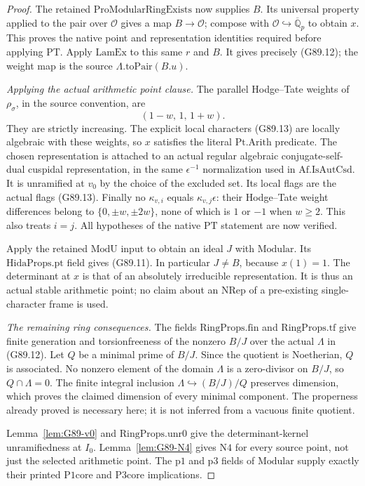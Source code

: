 \begin{proof}
The retained \(\mathrm{ProModularRingExists}\) now supplies
\(B\).  Its universal property applied to the pair over
\(\mathcal O\) gives a map \(B\to\mathcal O\);
compose with \(\mathcal O\hookrightarrow\overline{\mathbb Q}_p\)
to obtain \(x\).
This proves the native point and representation identities
required before applying \(\mathrm{PT}\).
Apply \(\mathrm{LamEx}\) to this same \(r\) and \(B\).
It gives precisely (G89.12); the weight map is the source
\(\Lambda.\mathrm{toPair}(B.u)\).

\emph{Applying the actual arithmetic point clause.}
The parallel Hodge--Tate weights of \(\rho_\sigma\), in the
source convention, are
\[
                         (1-w,\,1,\,1+w).         \tag{G89.14}
\]
They are strictly increasing.
The explicit local characters (G89.13) are locally algebraic
with these weights, so \(x\) satisfies the literal
\(\mathrm{Pt.Arith}\) predicate.
The chosen representation is attached to an actual regular
algebraic conjugate-self-dual cuspidal representation, in the
same \(\epsilon^{-1}\) normalization used in
\(\mathrm{Af.IsAutCsd}\).
It is unramified at \(v_0\) by the choice of the excluded set.
Its local flags are the actual flags (G89.13).
Finally no \(\kappa_{v,i}\) equals
\(\kappa_{v,j}\epsilon\): their Hodge--Tate weight differences
belong to \(\{0,\pm w,\pm2w\}\), none of which is \(1\) or
\(-1\) when \(w\ge2\).
This also treats \(i=j\).
All hypotheses of the native \(\mathrm{PT}\) statement
are now verified.

Apply the retained \(\mathrm{ModU}\) input to obtain
an ideal \(J\) with \(\mathrm{Modular}\).
Its \(\mathrm{HidaProps.pt}\) field gives (G89.11).
In particular \(J\ne B\), because \(x(1)=1\).
The determinant at \(x\) is that of an absolutely irreducible
representation.  It is thus an actual stable arithmetic point;
no claim about an \(\mathrm{NRep}\) of a pre-existing
single-character frame is used.

\emph{The remaining ring consequences.}
The fields \(\mathrm{RingProps.fin}\) and
\(\mathrm{RingProps.tf}\) give finite generation and
torsionfreeness of the nonzero \(B/J\) over the actual
\(\Lambda\) in (G89.12).
Let \(Q\) be a minimal prime of \(B/J\).
Since the quotient is Noetherian, \(Q\) is associated.
No nonzero element of the domain \(\Lambda\) is a
zero-divisor on \(B/J\), so \(Q\cap\Lambda=0\).
The finite integral inclusion
\(\Lambda\hookrightarrow(B/J)/Q\) preserves dimension,
which proves the claimed dimension of every minimal component.
The properness already proved is necessary here; it is not
inferred from a vacuous finite quotient.

Lemma~\ref{lem:G89-v0} and
\(\mathrm{RingProps.unr0}\) give the determinant-kernel
unramifiedness at \(I_0\).
Lemma~\ref{lem:G89-N4} gives \(\mathrm{N4}\) for every
source point, not just the selected arithmetic point.
The \(\mathrm{p1}\) and \(\mathrm{p3}\) fields of
\(\mathrm{Modular}\) supply exactly their printed
\(\mathrm{P1core}\) and \(\mathrm{P3core}\) implications.
\end{proof}

